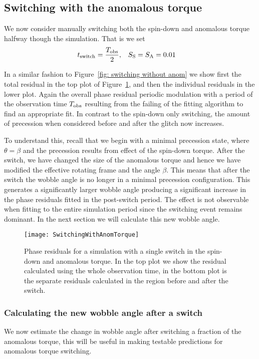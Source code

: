 \documentclass[../full_thesis/full_thesis.tex]{subfiles}
\begin{document}
\subsection{Switching with the anomalous torque}
We now consider manually switching both the spin-down and anomalous torque
halfway though the simulation.  That is we set
\begin{align}
    t_{\mathrm{switch}} = \frac{T_{\textrm{obs}}}{2}, &&& S_{\mathrm{S}} = S_{\mathrm{A}} = 0.01
\end{align}

In a similar fashion to Figure~\ref{fig: switching without anom} we show first
the total residual in the top plot of Figure~\ref{fig: switching with anom}, and
then the individual residuals in the lower plot. Again the overall phase
residual periodic modulation with a period of the observation time $T_{\textrm{obs}}$
resulting from the failing of the fitting algorithm to find an appropriate fit.
In contrast to the spin-down only switching, the amount of precession when
considered before and after the glitch now increases.

To understand this, recall that we begin with a minimal precession state, where
$\theta = \beta$ and the precession results from effect of the spin-down
torque.  After the switch, we have changed the size of the anomalous torque and
hence we have modified the effective rotating frame and the angle $\beta$. This
means that after the switch the wobble angle is no longer in a minimal
precession configuration.
This generates a significantly larger wobble angle producing a significant
increase in the phase residuals fitted in the post-switch period. The effect is
not observable when fitting to the entire simulation period since the switching
event remains dominant. In the next section we will calculate this new wobble
angle.
\begin{figure}[htb]
\texttt{[image: SwitchingWithAnomTorque]} \caption{Phase
residuals for a simulation with a single switch in the spin-down and anomalous
torque. In the top plot we show the residual calculated using the whole
observation time, in the bottom plot is the separate residuals calculated in
the region before and after the switch.}
\label{fig: switching with anom}
\end{figure}

\subsubsection{Calculating the new wobble angle after a switch}
We now estimate the change in wobble angle after switching a fraction of the
anomalous torque, this will be useful in making testable predictions for
anomalous torque switching.
\end{document}
